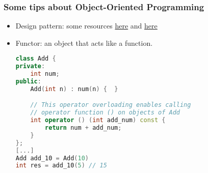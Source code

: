\documentclass[a4paper,12pt,%
              final%
              ]{article}
\begin{document}
\subsubsection{Some tips about Object-Oriented Programming}
\begin{itemize}
  \item Design pattern: some resources \href{https://www.tutorialspoint.com/design_pattern/design_pattern_overview.htm}{here} and \href{https://sourcemaking.com/design_patterns}{here}
  \item Functor: an object that acts like a function.
    \begin{lstlisting}[language=C++]
class Add {
private:
    int num;
public:
    Add(int n) : num(n) {  }

    // This operator overloading enables calling
    // operator function () on objects of Add
    int operator () (int add_num) const {
        return num + add_num;
    }
};
[...]
Add add_10 = Add(10)
int res = add_10(5) // 15
    \end{lstlisting}
\end{itemize}

\end{document}
